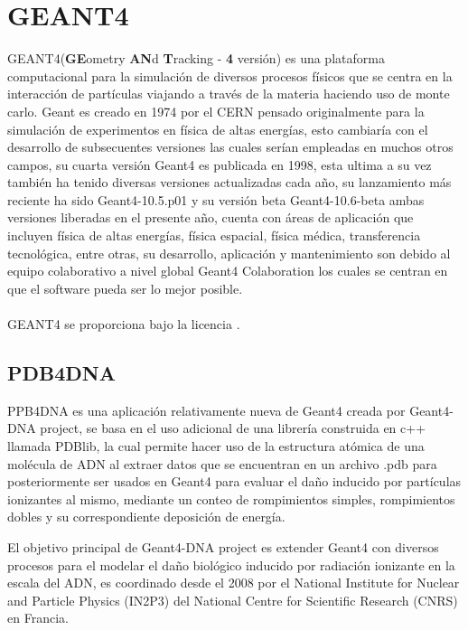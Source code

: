
\clearpage

\section{GEANT4}
\label{sec:Intro}
GEANT4(\textbf{GE}ometry \textbf{AN}d \textbf{T}racking - \textbf{4} versión) es una plataforma computacional para la simulación de diversos procesos físicos que se centra en la interacción de partículas viajando a través de la materia haciendo uso de monte carlo. Geant es creado en 1974 por el CERN pensado originalmente para la simulación de experimentos en física de altas energías, esto cambiaría con el desarrollo de subsecuentes versiones las cuales serían empleadas en muchos otros campos, su cuarta versión Geant4 es publicada en 1998, esta ultima a su vez también ha tenido diversas versiones actualizadas cada año, su lanzamiento más reciente ha sido Geant4-10.5.p01 y su versión beta Geant4-10.6-beta ambas versiones liberadas en el presente año,  cuenta  con áreas de aplicación que incluyen física de altas energías, física espacial, física médica, transferencia tecnológica, entre otras, su desarrollo, aplicación y mantenimiento son debido al equipo colaborativo a nivel global Geant4 Colaboration los cuales se centran en que el software pueda ser lo mejor posible.
\\
\\
GEANT4 se proporciona bajo la licencia \href{https://geant4.web.cern.ch/license/LICENSE.html}{\color{blue}{Geant4 Software License}}.

\subsection{PDB4DNA}

PPB4DNA es una aplicación relativamente nueva de Geant4 creada por Geant4-DNA project, se basa en el uso adicional de una librería construida en c++ llamada PDBlib, la cual permite hacer uso de la estructura atómica de una molécula de ADN al extraer datos que se encuentran en un archivo .pdb para posteriormente ser usados en Geant4 para evaluar el daño inducido por partículas ionizantes al mismo, mediante un conteo de rompimientos simples, rompimientos dobles y su correspondiente deposición de energía.

El objetivo principal de Geant4-DNA project  es extender Geant4 con diversos procesos para el modelar el daño biológico inducido por radiación ionizante en la escala del ADN, es coordinado desde el 2008 por el National Institute for Nuclear and Particle Physics (IN2P3) del National Centre for Scientific Research (CNRS) en Francia.


